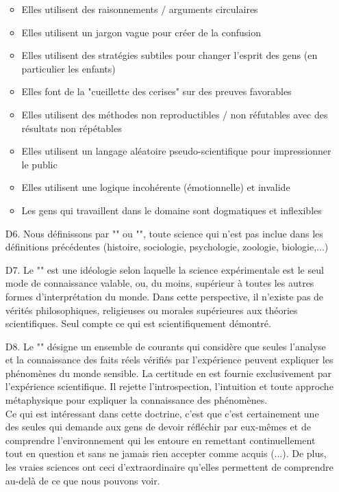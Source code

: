 \begin{itemize}
\begin{itemize}
		\item Elles utilisent des raisonnements / arguments circulaires

		\item Elles utilisent un jargon vague pour créer de la confusion

		\item Elles utilisent des stratégies subtiles pour changer l'esprit des gens (en particulier les enfants)

		\item Elles font de la "cueillette des cerises" sur des preuves favorables

		\item Elles utilisent des méthodes non reproductibles / non réfutables avec des résultats non répétables

		\item Elles utilisent un langage aléatoire pseudo-scientifique pour impressionner le public

		\item Elles utilisent une logique incohérente (émotionnelle) et invalide

		\item Les gens qui travaillent dans le domaine sont dogmatiques et inflexibles
	\end{itemize}

	\item[D6.] Nous définissons par "" ou "", toute science qui n'est pas inclue dans les définitions précédentes (histoire, sociologie, psychologie, zoologie, biologie,...)

	\item[D7.] Le "" est une idéologie selon laquelle la science expérimentale est le seul mode de connaissance valable, ou, du moins, supérieur à toutes les autres formes d'interprétation du monde. Dans cette perspective, il n'existe pas de vérités philosophiques, religieuses ou morales supérieures aux théories scientifiques. Seul compte ce qui est scientifiquement démontré.

	\item[D8.] Le "" désigne un ensemble de courants qui considère que seules l'analyse et la connaissance des faits réels vérifiés par l'expérience peuvent expliquer les phénomènes du monde sensible. La certitude en est fournie exclusivement par l'expérience scientifique. Il rejette l'introspection, l'intuition et toute approche métaphysique pour expliquer la connaissance des phénomènes.\\
	
	Ce qui est intéressant dans cette doctrine, c'est que c'est certainement une des seules qui demande aux gens de devoir réfléchir par eux-mêmes et de comprendre l'environnement qui les entoure en remettant continuellement tout en question et sans ne jamais rien accepter comme acquis (...). De plus, les vraies sciences ont ceci d'extraordinaire qu'elles permettent de comprendre au-delà de ce que nous pouvons voir.
\end{itemize}

